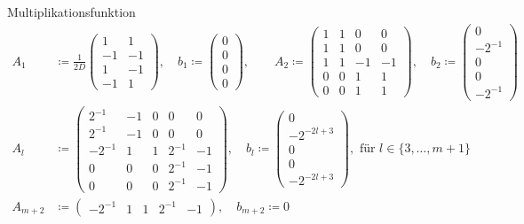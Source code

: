 \documentclass[10pt,aspectratio=169]{beamer}
\theoremstyle{plain} %
\theoremstyle{remark} %
\newcommand{\set}[1]{\{#1\}}
\begin{document}
\begin{frame}{Multiplikationsfunktion}
    \begin{align*}
        A_1 &\coloneqq \frac{1}{2D} \begin{pmatrix}
            1 & 1 \\ -1 & -1 \\ 1 & -1 \\ -1 & 1
        \end{pmatrix}, \quad b_1 \coloneqq \begin{pmatrix}
            0 \\ 0 \\ 0 \\ 0
        \end{pmatrix}, \qquad
        A_2 \coloneqq \begin{pmatrix}
            1 & 1 & 0 & 0 \\
            1 & 1 & 0 & 0 \\
            1 & 1 & -1 & -1 \\
            0 & 0 & 1 & 1 \\
            0 & 0 & 1 & 1
        \end{pmatrix}, \quad b_2 \coloneqq \begin{pmatrix}
            0 \\ -2^{-1} \\ 0 \\ 0 \\ -2^{-1}
        \end{pmatrix} \\
        A_l &\coloneqq \begin{pmatrix}
            2^{-1} & -1 & 0 & 0 & 0 \\
            2^{-1} & -1 & 0 & 0 & 0 \\
            -2^{-1} & 1 & 1 & 2^{-1} & -1 \\
            0 & 0 & 0 & 2^{-1} & -1 \\
            0 & 0 & 0 & 2^{-1} & -1
        \end{pmatrix}, \quad b_l \coloneqq \begin{pmatrix}
            0 \\ -2^{-2l+3} \\ 0 \\ 0 \\ -2^{-2l+3}
        \end{pmatrix}, \text{ für } l \in \set{3, \ldots, m+1} \\
        A_{m+2} &\coloneqq \begin{pmatrix}
            -2^{-1} & 1 & 1 & 2^{-1} & -1
        \end{pmatrix}, \quad b_{m+2} \coloneqq 0
    \end{align*}
\end{frame}
\end{document}
